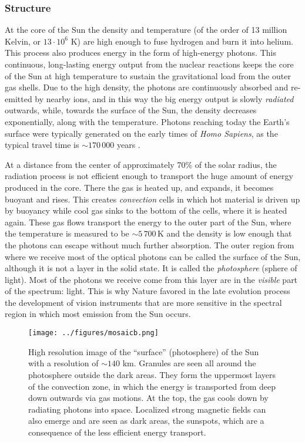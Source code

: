 \subsubsection*{Structure}
At the core of the Sun the density and temperature (of the order of 13 million Kelvin, or $13 \cdot 10^{6}$ K) are high enough to fuse hydrogen and burn it into helium. This process also produces energy in the form of high-energy photons.  This continuous, long-lasting energy output from the nuclear reactions keeps the core of the Sun at high temperature to sustain the gravitational load from the outer gas shells. Due to the high density, the photons are continuously absorbed and re-emitted by nearby ions, and in this way the big energy output is slowly \emph{radiated} outwards,  while, towards the surface of the Sun, the density decreases exponentially, along with the temperature. Photons reaching today the Earth's surface were typically generated on the early times of \emph{Homo Sapiens}, as the typical travel time is $\sim170\,000$ years \citep{1992ApJ...401..759M}. 

At a distance from the center of approximately 70\% of the solar radius, the radiation process is not efficient enough to transport the huge amount of energy produced in the core. There the gas is heated up, and expands, it becomes buoyant and rises. This creates \emph{convection} cells in which hot material is driven up by buoyancy while cool gas sinks to the bottom of the cells, where it is heated again. These gas flows transport the energy to the outer part of the Sun, where the temperature is measured to be $\sim 5\,700\,$K and the density is low enough that the photons can escape without much further absorption. The outer region from where we receive most of the optical photons can be called the surface of the Sun, although it is not a layer in the solid state. It is called the \emph{photosphere} (sphere of light). Most of the photons we receive come from this layer are in the \emph{visible} part of the spectrum: light. This is why Nature favored in the late evolution process the development of vision instruments that are more sensitive %
in the spectral region in which most emission from the Sun occurs.
\begin{figure}[t]
\begin{center}
\texttt{[image: ../figures/mosaicb.png]}
\caption{High resolution image of the ``surface'' (photosphere) of the Sun with a resolution of $\sim140$ km. Granules are seen all around the photosphere outside the dark areas. They form the uppermost layers of the convection zone, in which the energy is transported from deep down outwards via gas motions. At the top, the gas cools down by radiating photons into space. Localized strong magnetic fields can also emerge and are seen as dark areas, the sunspots, which are a consequence of the less efficient energy transport.}
\label{fig:photosphere}
\end{center}
\end{figure}

